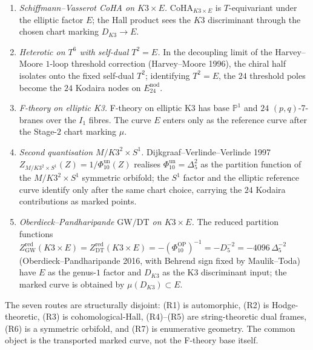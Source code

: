 \begin{conjecture}
\begin{enumerate}[label=\textup{(R\arabic*)}, leftmargin=2.6em]
\item \emph{Schiffmann--Vasserot CoHA on $K3\times E$.}
 $\mathrm{CoHA}_{K3\times E}$ is $T$-equivariant under the elliptic
 factor $E$; the Hall product sees the \(K3\) discriminant through the chosen chart marking \(D_{K3}\to E\).
\item \emph{Heterotic on $T^6$ with self-dual $T^2 = E$.} In the
 decoupling limit of the Harvey--Moore $1$-loop threshold correction
 (Harvey--Moore 1996), the chiral half isolates onto the
 fixed self-dual $T^2$; identifying $T^2 = E$, the $24$ threshold
 poles become the $24$ Kodaira nodes on $E^{\mathrm{nod}}_{24}$.
\item \emph{F-theory on elliptic K3.} F-theory on elliptic K3 has base \(\mathbb P^1\) and \(24\) \((p,q)\)-7-branes over the \(I_1\) fibres. The curve \(E\) enters only as the reference curve after the Stage-$2$ chart marking \(\mu\).
\item \emph{Second quantisation $M/K3^2\times S^1$.} Dijkgraaf--Verlinde--Verlinde
 1997 \(Z_{M/K3^2\times S^1}(Z) = 1/\Phi_{10}^{\mathrm{un}}(Z)\) realises
 \(\Phi_{10}^{\mathrm{un}}=\Delta_5^2\)
 as the partition function of the \(M/K3^2\times S^1\) symmetric
 orbifold; the \(S^1\) factor and the elliptic reference curve identify only after the same chart choice, carrying the \(24\) Kodaira contributions as marked points.
\item \emph{Oberdieck--Pandharipande $\mathrm{GW}/\mathrm{DT}$ on $K3\times E$.}
 The reduced partition functions
 $Z^{\mathrm{red}}_{\mathrm{GW}}(K3\times E) =
 Z^{\mathrm{red}}_{\mathrm{DT}}(K3\times E) = -(\Phi_{10}^{\mathrm{OP}})^{-1}
 = -D_5^{-2} = -4096\,\Delta_5^{-2}$
 (Oberdieck--Pandharipande 2016, with Behrend sign fixed by
 Maulik--Toda) have \(E\) as the genus-$1$ factor and \(D_{K3}\) as the K3 discriminant input; the marked curve is obtained by \(\mu(D_{K3})\subset E\).
\end{enumerate}
The seven routes are structurally disjoint: \textup{(R1)} is
automorphic, \textup{(R2)} is Hodge-theoretic, \textup{(R3)} is
cohomological-Hall, \textup{(R4)--(R5)} are string-theoretic dual
frames, \textup{(R6)} is a symmetric orbifold, and \textup{(R7)} is
enumerative geometry. The common object is the transported marked curve, not the F-theory base itself.
\end{conjecture}

